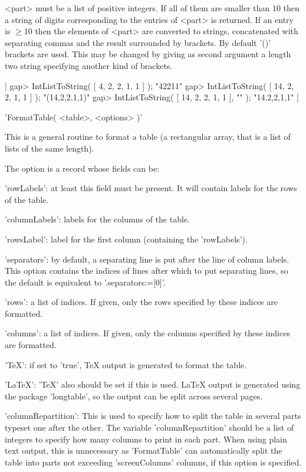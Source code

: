 <part>  must be a list  of positive integers. If all  of them are smaller
than 10 then a string of digits corresponding to the entries of <part> is
returned.  If  an entry is  $\ge 10$  then  the elements of  <part>  are
converted to strings, concatenated  with separating commas and the result
surrounded by brackets.  By default '()' brackets  are used.  This may be
changed  by giving  as  second argument a  length   two string specifying
another kind of brackets.

|    gap> IntListToString( [ 4, 2, 2, 1, 1 ] );
    "42211"
    gap> IntListToString( [ 14, 2, 2, 1, 1 ] );
    "(14,2,2,1,1)"
    gap> IntListToString( [ 14, 2, 2, 1, 1 ], "{}" );
    "{14,2,2,1,1}" |

%
%

'FormatTable( <table>, <options> )'

This is a general routine to format a table (a rectangular array, that is a
list of lists of the same length).

The option is a record whose fields can be:

'rowLabels':  at least this  field must be  present. It will contain labels
for the rows of the table.

'columnLabels': labels for the columns of the table.

'rowsLabel': label for the first column (containing the 'rowLabels').

'separators': by default, a separating line is put after the line of column
labels.  This  option  contains  the  indices  of  lines after which to put
separating lines, so the default is equivalent to '.separators:=[0]'.

'rows':  a list  of indices.  If given,  only the  rows specified  by these
indices are formatted.

'columns': a list of indices. If given, only the columns specified by these
indices are formatted.

'TeX': if set to 'true', TeX output is generated to format the table.

'LaTeX':  'TeX'  also  should  be  set  if  this  is  used. LaTeX output is
generated  using the package 'longtable', so the output can be split across
several pages.

'columnRepartition':  This is  used to  specify how  to split  the table in
several parts typeset one after the other. The variable 'columnRepartition'
should  be a list of integers to specify  how many columns to print in each
part.  When using plain  text output, this  is unnecessary as 'FormatTable'
can  automatically split the table into parts not exceeding 'screenColumns'
columns, if this option is specified.

